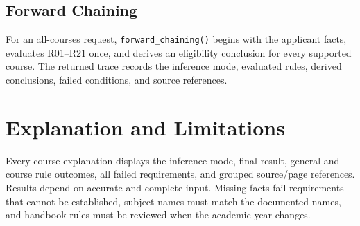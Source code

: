 \documentclass[11pt]{article}
\begin{document}
\subsection{Forward Chaining}

For an all-courses request, \texttt{forward\_chaining()} begins with the
applicant facts, evaluates R01--R21 once, and derives an eligibility conclusion
for every supported course. The returned trace records the inference mode,
evaluated rules, derived conclusions, failed conditions, and source references.

\section{Explanation and Limitations}

Every course explanation displays the inference mode, final result, general
and course rule outcomes, all failed requirements, and grouped source/page
references. Results depend on accurate and complete input. Missing facts fail
requirements that cannot be established, subject names must match the
documented names, and handbook rules must be reviewed when the academic year
changes.
\end{document}
